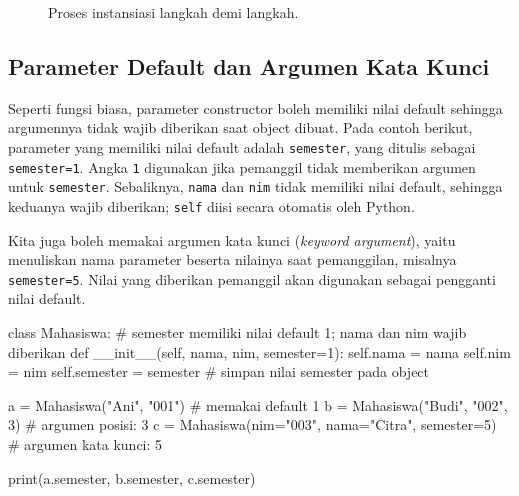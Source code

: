 \begin{figure}[htbp]
\centering
{}
\caption{Proses instansiasi langkah demi langkah.}
\label{fig:b1-instansiasi}
\end{figure}

\subsection{Parameter Default dan Argumen Kata Kunci}

Seperti fungsi biasa, parameter constructor boleh memiliki nilai default sehingga argumennya tidak wajib diberikan saat object dibuat. Pada contoh berikut, parameter yang memiliki nilai default adalah \texttt{semester}, yang ditulis sebagai \texttt{semester=1}. Angka \texttt{1} digunakan jika pemanggil tidak memberikan argumen untuk \texttt{semester}. Sebaliknya, \texttt{nama} dan \texttt{nim} tidak memiliki nilai default, sehingga keduanya wajib diberikan; \texttt{self} diisi secara otomatis oleh Python.

Kita juga boleh memakai argumen kata kunci (\emph{keyword argument}), yaitu menuliskan nama parameter beserta nilainya saat pemanggilan, misalnya \texttt{semester=5}. Nilai yang diberikan pemanggil akan digunakan sebagai pengganti nilai default.

\begin{kode}
class Mahasiswa:
    # semester memiliki nilai default 1; nama dan nim wajib diberikan
    def __init__(self, nama, nim, semester=1):
        self.nama = nama
        self.nim = nim
        self.semester = semester  # simpan nilai semester pada object

a = Mahasiswa("Ani", "001")                        # memakai default 1
b = Mahasiswa("Budi", "002", 3)                    # argumen posisi: 3
c = Mahasiswa(nim="003", nama="Citra", semester=5) # argumen kata kunci: 5

print(a.semester, b.semester, c.semester)
\end{kode}

